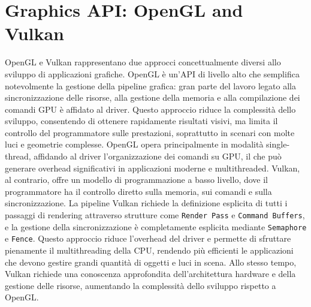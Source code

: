 \documentclass[12pt,a4paper,openright,twoside]{book}
\begin{document}
\section{Graphics API: OpenGL and Vulkan}
OpenGL e Vulkan rappresentano due approcci concettualmente diversi allo sviluppo di applicazioni grafiche.
OpenGL è un'API di livello alto che semplifica notevolmente la gestione della pipeline grafica: gran parte del lavoro
legato alla sincronizzazione delle risorse, alla gestione della memoria e alla compilazione dei comandi GPU è affidato
al driver. Questo approccio riduce la complessità dello sviluppo, consentendo di ottenere rapidamente risultati visivi,
ma limita il controllo del programmatore sulle prestazioni, soprattutto in scenari con molte luci e geometrie complesse.
OpenGL opera principalmente in modalità single-thread, affidando al driver l'organizzazione dei comandi su GPU, il che può
generare overhead significativi in applicazioni moderne e multithreaded.
Vulkan, al contrario, offre un modello di programmazione a basso livello, dove il programmatore ha il controllo diretto
sulla memoria, sui comandi e sulla sincronizzazione. La pipeline Vulkan richiede la definizione esplicita di tutti i
passaggi di rendering attraverso strutture come \texttt{Render Pass} e \texttt{Command Buffers}, e la gestione della 
sincronizzazione è completamente esplicita mediante \texttt{Semaphore} e \texttt{Fence}. Questo approccio riduce
l'overhead del driver e permette di sfruttare pienamente il multithreading della CPU, rendendo più efficienti
le applicazioni che devono gestire grandi quantità di oggetti e luci in scena. Allo stesso tempo, Vulkan richiede
una conoscenza approfondita dell'architettura hardware e della gestione delle risorse, aumentando la complessità
dello sviluppo rispetto a OpenGL.
\end{document}
